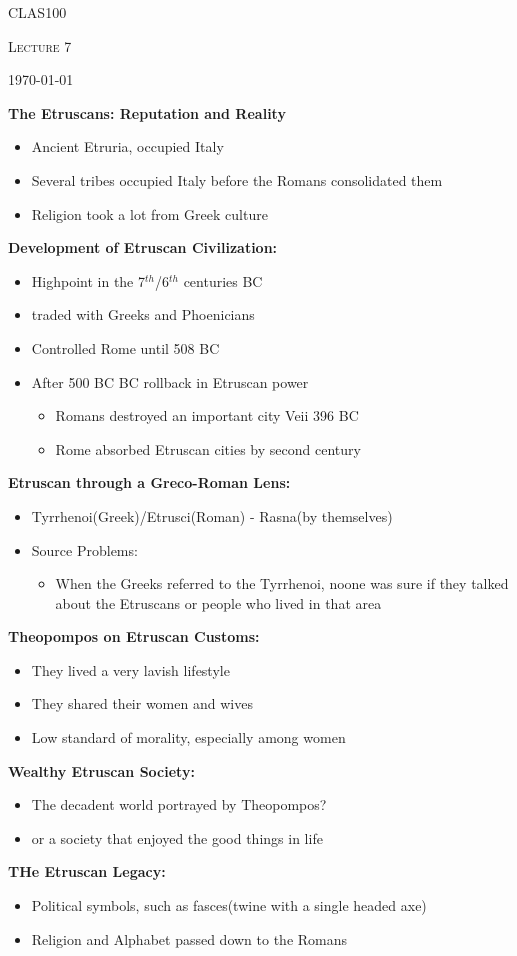 \documentclass[12pt,a4paper]{report}
\begin{document}
	\centering
	{\scshape\LARGE CLAS100 \par}
	{\scshape\Large Lecture 7\par}
	{\large \today\par}
	\vspace{1.5cm}
	
\textbf{The Etruscans: Reputation and Reality}
\begin{itemize}
\item Ancient Etruria, occupied Italy
\item Several tribes occupied Italy before the Romans consolidated them
\item Religion took a lot from Greek culture
\end{itemize}
\textbf{Development of Etruscan Civilization:}
\begin{itemize}
\item Highpoint in the 7$^{th}$/6$^{th}$ centuries BC
\item traded with Greeks and Phoenicians
\item Controlled Rome until 508 BC
\item After 500 BC BC rollback in Etruscan power
\begin{itemize}
\item Romans destroyed an important city Veii 396 BC
\item Rome absorbed Etruscan cities by second century
\end{itemize}
\end{itemize}
\textbf{Etruscan through a Greco-Roman Lens:}
\begin{itemize}
\item Tyrrhenoi(Greek)/Etrusci(Roman) - Rasna(by themselves)
\item Source Problems:
\begin{itemize}
\item When the Greeks referred to the Tyrrhenoi, noone was sure if they talked about the Etruscans or people who lived in that area
\end{itemize}
\end{itemize}
\textbf{Theopompos on Etruscan Customs:}
\begin{itemize}
\item They lived a very lavish lifestyle
\item They shared their women and wives
\item Low standard of morality, especially among women
\end{itemize}
\textbf{Wealthy Etruscan Society:}
\begin{itemize}
\item The decadent world portrayed by Theopompos?
\item or a society that enjoyed the good things in life
\end{itemize}
\textbf{THe Etruscan Legacy:}
\begin{itemize}
\item Political symbols, such as fasces(twine with a single headed axe)
\item Religion and Alphabet passed down to the Romans
\end{itemize}
\end{document}
